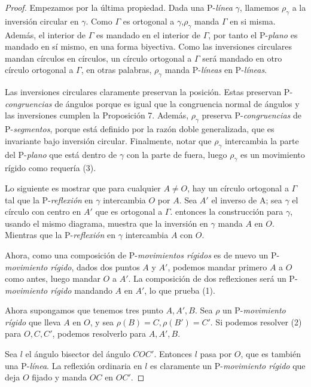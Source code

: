 \documentclass[a4paper]{amsart}
\theoremstyle{plain}
\begin{document}
\begin{proof}
Empezamos por la última propiedad. Dada una P-\textit{línea} $\gamma$, llamemos $\rho_\gamma$ a la inversión circular en $\gamma$. Como $\Gamma$ es ortogonal a $\gamma$,$\rho_\gamma$ manda $\Gamma $ en si misma. Además, el interior de $\Gamma$ es mandado en el interior de $\Gamma$, por tanto el P-\textit{plano} es mandado en sí mismo, en una forma biyectiva. Como las inversiones circulares mandan círculos en círculos, un círculo ortogonal a $\Gamma$   será mandado en otro círculo ortogonal a $\Gamma$, en otras palabras, $\rho_\gamma$ manda P-\textit{líneas} en P-\textit{líneas}.

Las inversiones circulares claramente preservan la posición. Estas preservan P-\textit{congruencias} de ángulos porque es igual que la congruencia normal de ángulos y las inversiones cumplen la Proposición 7. Además, $\rho_\gamma$ preserva P-\textit{congruencias} de P-\textit{segmentos}, porque está definido por la razón doble generalizada, que es invariante bajo inversión circular. Finalmente, notar que $\rho_\gamma$ intercambia la parte del P-\textit{plano} que está dentro de $\gamma$ con la parte de fuera, luego $\rho_\gamma$ es un movimiento rígido como requería (3).

Lo siguiente es mostrar que para cualquier $A\neq O$, hay un círculo ortogonal a $\Gamma$ tal que la P-\textit{reflexión} en $\gamma$ intercambia $O$ por $A$. Sea $A'$ el inverso de A; sea $\gamma$ el círculo con centro en $A'$ que es ortogonal a $\Gamma$. entonces la construcción para $\gamma$, usando el mismo diagrama, muestra que la inversión en $\gamma$ manda $A$ en $O$. Mientras que la P-\textit{reflexión} en $\gamma$ intercambia $A$ con $O$.

Ahora, como una composición de P-\textit{movimientos rígidos} es de nuevo un P-\textit{movimiento rígido}, dados dos puntos $A$ y $A'$, podemos mandar primero $A$ a $O$ como antes, luego mandar $O$ a $A'$. La composición de dos reflexiones será un P-\textit{movimiento rígido} mandando $A$ en $A'$, lo que prueba (1).

Ahora supongamos que tenemos tres punto $A,A',B$. Sea $\rho$ un P-\textit{movimiento rígido} que lleva $A$ en $O$, y sea $\rho(B)=C,\rho(B')=C'$. Si podemos resolver (2) para $O,C,C'$, podemos resolverlo para $A,A',B$.

Sea $l$ el ángulo bisector del ángulo $COC'$. Entonces $l$ pasa por $O$, que es también una P-\textit{línea}. La reflexión ordinaria en $l$ es claramente un P-\textit{movimiento rígido} que deja $O$ fijado y manda $OC$ en $OC'$.
\end{proof}
\end{document}
